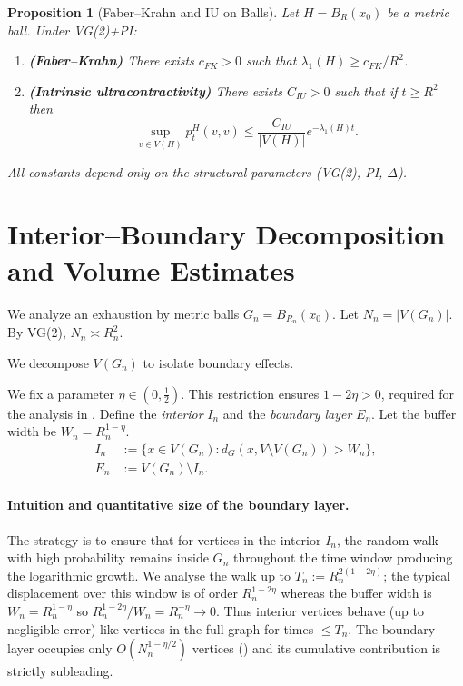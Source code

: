 \documentclass{article}
\numberwithin{equation}{section}
\newtheorem{proposition}[theorem]{Proposition}
\theoremstyle{definition}
\theoremstyle{remark}
\begin{document}
\begin{proposition}[Faber--Krahn and IU on Balls]\label{prop:IU}
Let $H=B_R(x_0)$ be a metric ball. Under VG(2)+PI:
\begin{enumerate}
    \item \textbf{(Faber--Krahn)} There exists $c_{FK}>0$ such that $\lambda_1(H)\ge c_{FK}/R^{2}$.
    \item \textbf{(Intrinsic ultracontractivity)} There exists $C_{IU}>0$ such that if $t\ge R^{2}$ then
    \begin{equation}\label{eq:IU}
        \sup_{v \in V(H)} p_t^H(v,v) \leq \frac{C_{IU}}{|V(H)|} e^{-\lambda_1(H) t}.
    \end{equation}
\end{enumerate}
All constants depend only on the structural parameters (VG(2), PI, $\Delta$).
\end{proposition}

\section{Interior--Boundary Decomposition and Volume Estimates}\label{sec:decomposition}

We analyze an exhaustion by metric balls $G_n = B_{R_n}(x_0)$. Let $N_n = |V(G_n)|$. By VG(2), $N_n \asymp R_n^2$.

We decompose $V(G_n)$ to isolate boundary effects.

We fix a parameter $\eta \in (0, \tfrac{1}{2})$. This restriction ensures $1-2\eta>0$, required for the analysis in . Define the \emph{interior} $I_n$ and the \emph{boundary layer} $E_n$. Let the buffer width be $W_n = R_n^{1-\eta}$.
\begin{align*}
I_n &:= \{x \in V(G_n) : d_G(x, V \setminus V(G_n)) > W_n\}, \\
E_n &:= V(G_n) \setminus I_n.
\end{align*}

\paragraph{Intuition and quantitative size of the boundary layer.} The strategy is to ensure that for vertices in the interior $I_n$, the random walk with high probability remains inside $G_n$ throughout the time window producing the logarithmic growth. We analyse the walk up to $T_n:=R_n^{2(1-2\eta)}$; the typical displacement over this window is of order $R_n^{1-2\eta}$ whereas the buffer width is $W_n=R_n^{1-\eta}$ so $R_n^{1-2\eta}/W_n=R_n^{-\eta}\to0$. Thus interior vertices behave (up to negligible error) like vertices in the full graph for times $\le T_n$. The boundary layer occupies only $O(N_n^{1-\eta/2})$ vertices () and its cumulative contribution is strictly subleading.
\end{document}
